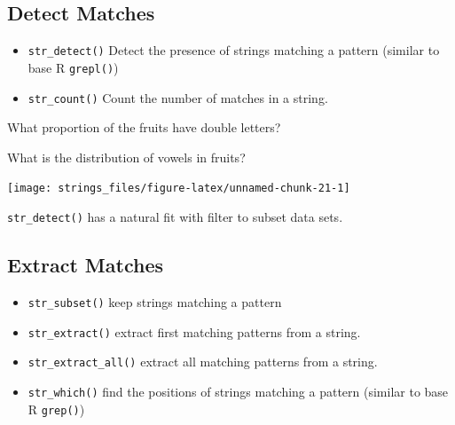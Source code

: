 \documentclass[]{book}
\newenvironment{Shaded}{\begin{snugshade}}{\end{snugshade}}
\newcommand{\CharTok}[1]{\textcolor[rgb]{0.31,0.60,0.02}{#1}}
\newcommand{\CommentTok}[1]{\textcolor[rgb]{0.56,0.35,0.01}{\textit{#1}}}
\newcommand{\KeywordTok}[1]{\textcolor[rgb]{0.13,0.29,0.53}{\textbf{#1}}}
\newcommand{\NormalTok}[1]{#1}
\newcommand{\OperatorTok}[1]{\textcolor[rgb]{0.81,0.36,0.00}{\textbf{#1}}}
\newcommand{\StringTok}[1]{\textcolor[rgb]{0.31,0.60,0.02}{#1}}
\providecommand{\tightlist}{%
  \setlength{\itemsep}{0pt}\setlength{\parskip}{0pt}}
\theoremstyle{definition}
\theoremstyle{definition}
\theoremstyle{definition}
\theoremstyle{remark}
\let\BeginKnitrBlock\begin \let\EndKnitrBlock\end
\begin{document}
\hypertarget{detect-matches}{%
\subsection{Detect Matches}\label{detect-matches}}

\begin{itemize}
\tightlist
\item
  \texttt{str\_detect()} Detect the presence of strings matching a
  pattern (similar to base R \texttt{grepl()})
\item
  \texttt{str\_count()} Count the number of matches in a string.
\end{itemize}

What proportion of the fruits have double letters?

\begin{Shaded}
\end{Shaded}

What is the distribution of vowels in fruits?

\begin{Shaded}
\end{Shaded}

\begin{center}\texttt{[image: strings\_files/figure-latex/unnamed-chunk-21-1]} \end{center}

\BeginKnitrBlock{rmdtip}
\texttt{str\_detect()} has a natural fit with filter to subset data
sets.
\EndKnitrBlock{rmdtip}

\hypertarget{extract-matches}{%
\subsection{Extract Matches}\label{extract-matches}}

\begin{itemize}
\tightlist
\item
  \texttt{str\_subset()} keep strings matching a pattern
\item
  \texttt{str\_extract()} extract first matching patterns from a string.
\item
  \texttt{str\_extract\_all()} extract all matching patterns from a
  string.
\item
  \texttt{str\_which()} find the positions of strings matching a pattern
  (similar to base R \texttt{grep()})
\end{itemize}
\end{document}
